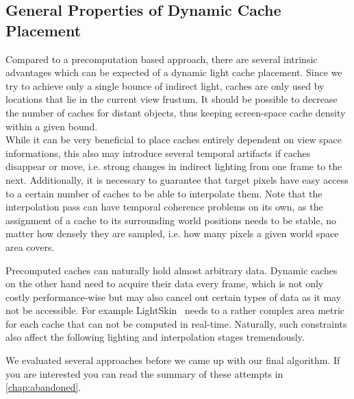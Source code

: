 \documentclass[thesis.tex]{subfiles}
\begin{document}
\subsection{General Properties of Dynamic Cache Placement} \label{sec:impl:dyncacheplace}
Compared to a precomputation based approach, there are several intrinsic advantages which can be expected of a dynamic light cache placement.
Since we try to achieve only a single bounce of indirect light, caches are only used by locations that lie in the current view frustum. %
It should be possible to decrease the number of caches for distant objects, thus keeping screen-space cache density within a given bound.
\\
While it can be very beneficial to place caches entirely dependent on view space informations, this also may introduce several temporal artifacts if caches disappear or move, i.e. strong changes in indirect lighting from one frame to the next.
Additionally, it is necessary to guarantee that target pixels have easy access to a certain number of caches to be able to interpolate them.
Note that the interpolation pass can have temporal coherence problems on its own, as the assignment of a cache to its surrounding world positions needs to be stable, no matter how densely they are sampled, i.e. how many pixels a given world space area covers.

Precomputed caches can naturally hold almost arbitrary data. %
Dynamic caches on the other hand need to acquire their data every frame, which is not only costly performance-wise but may also cancel out certain types of data as it may not be accessible.
For example LightSkin~\cite{bib:LightskinPaper} needs to a rather complex area metric for each cache that can not be computed in real-time.
Naturally, such constraints also affect the following lighting and interpolation stages tremendously.

We evaluated several approaches before we came up with our final algorithm.
If you are interested you can read the summary of these attempts in \autoref{chap:abandoned}.
\end{document}
